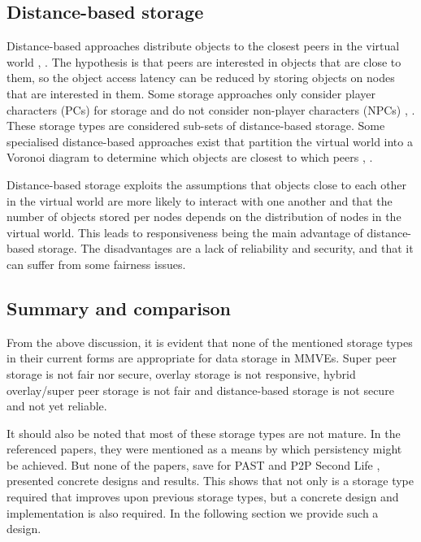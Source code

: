\documentclass[10pt,a4paper,conference]{IEEEtran}
\begin{document}
\subsection{Distance-based storage}
\label{classic_distance_based}

Distance-based approaches distribute objects to the closest peers in the virtual world \cite{colyseus_distance_based}, \cite{solipsis}. The
hypothesis is that peers are interested in objects that are close to them, so the object access latency can be reduced by storing objects on nodes
that are interested in them. Some storage approaches only consider player characters (PCs) for storage and do not consider non-player characters
(NPCs) \cite{individual_storage1}, \cite{cheat_proof_playout}. These storage types are considered sub-sets of distance-based storage. Some
specialised distance-based approaches exist that partition the virtual world into a Voronoi diagram to determine which objects are closest to which
peers \cite{Buyukkaya_voronoi_state_management}, \cite{Hu_voronoi_IM}.

Distance-based storage exploits the assumptions that objects close to each other in the virtual world are more likely to interact with one another
and that the number of objects stored per nodes depends on the distribution of nodes in the virtual world. This leads to responsiveness being the
main advantage of distance-based storage. The disadvantages are a lack of reliability and security, and that it can suffer from some fairness issues.

\subsection{Summary and comparison}

From the above discussion, it is evident that none of the mentioned storage types in their current forms are appropriate for data storage in MMVEs.
Super peer storage is not fair nor secure, overlay storage is not responsive, hybrid overlay/super peer storage is not fair and distance-based
storage is not secure and not yet reliable.

It should also be noted that most of these storage types are not mature. In the referenced papers, they were mentioned as a means by which
persistency might be achieved. But none of the papers, save for PAST \cite{storage_and_chaching_PAST} and P2P Second Life
\cite{varvello_p2p_second_life}, presented concrete designs and results. This shows that not only is a storage type required that improves upon
previous storage types, but a concrete design and implementation is also required. In the following section we provide such a design.
\end{document}
